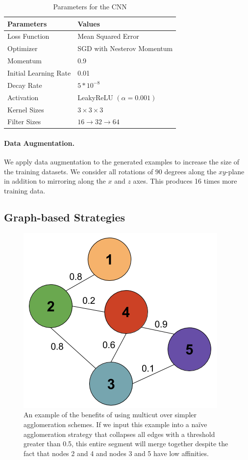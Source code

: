 \begin{table}[h!]
	\centering
	\begin{tabular}{l l} \hline
		\textbf{Parameters} & \textbf{Values} \\ \hline
		Loss Function & Mean Squared Error \\
		Optimizer & SGD  with Nesterov Momentum \\
		Momentum & 0.9 \\
		Initial Learning Rate & 0.01 \\
		Decay Rate & $5 * 10^{-8}$ \\
		Activation & LeakyReLU $(\alpha = 0.001)$ \\
		Kernel Sizes & $3 \times 3 \times 3$ \\
		Filter Sizes & $16 \to 32 \to 64$ \\ \hline
	\end{tabular}
	\caption{Parameters for the CNN}
	\label{table:architecture}
\end{table}



\paragraph{Data Augmentation.}
We apply data augmentation to the generated examples to increase the size of the training datasets. 
We consider all rotations of $90$ degrees along the $xy$-plane in addition to mirroring along the $x$ and $z$ axes. 
This produces 16 times more training data. 

\subsection{Graph-based Strategies}

\begin{figure}
	\centering
	\includegraphics[width=0.8\linewidth]{./figures/multicut.png}
	\caption{An example of the benefits of using multicut over simpler agglomeration schemes. If we input this example into a na\"ive agglomeration strategy that collapses all edges with a threshold greater than 0.5, this entire segment will merge together despite the fact that nodes 2 and 4 and nodes 3 and 5 have low affinities.}
	\label{fig:multicut}
\end{figure}

